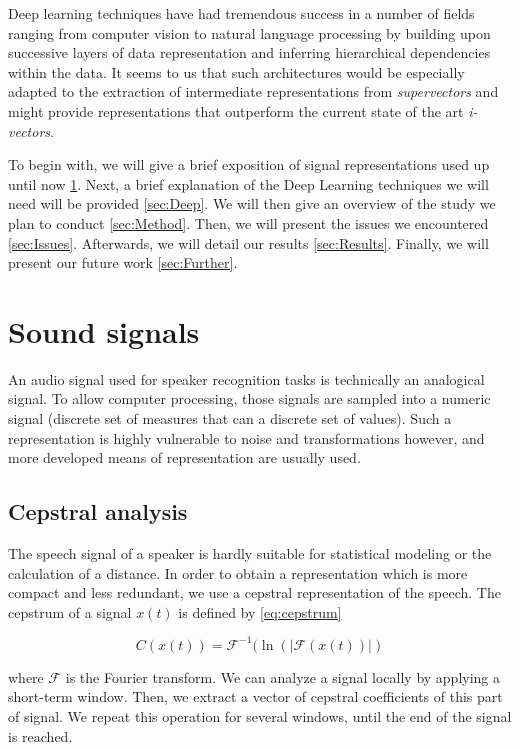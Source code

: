 \documentclass[conference]{IEEEtran}
\begin{document}
Deep learning techniques have had tremendous success in a number of fields
ranging from computer vision \cite{lecun1998gradient} to natural language
processing \cite{bordes2012joint} by building upon successive layers of data
representation and inferring hierarchical dependencies within the data. It seems
to us that such architectures would be especially adapted to the extraction of
intermediate representations from \emph{supervectors} and might provide
representations that outperform the current state of the art \emph{i-vectors}.

To begin with, we will give a brief exposition of signal representations used
up until now \ref{sec:signal}. Next, a brief explanation of the Deep
Learning techniques we will need will be provided \ref{sec:Deep}. We
will then give an overview of the study we plan to conduct \ref{sec:Method}.
Then, we will present the issues we encountered \ref{sec:Issues}.
Afterwards, we will detail our results \ref{sec:Results}.
Finally, we will present our future work \ref{sec:Further}.

\section{Sound signals}
\label{sec:signal}
An audio signal used for speaker recognition tasks is technically an analogical
signal. To allow computer processing, those signals are sampled into a numeric
signal (discrete set of measures that can a discrete set of values). Such a
representation is highly vulnerable to noise and transformations however,
and more developed means of representation are usually used.

\subsection{Cepstral analysis}

The speech signal of a speaker is hardly suitable for statistical modeling or
the calculation of a distance.
In order to obtain a representation which is more compact and less redundant, we
use a cepstral representation of the speech.
The cepstrum of a signal $x(t)$ is defined by \eqref{eq:cepstrum}

\begin{equation}
  C(x(t)) = \mathcal{F}^{-1}(\ln(|\mathcal{F}(x(t))|)
   \label{eq:cepstrum}
\end{equation}

where $\mathcal{F}$ is the Fourier transform.
We can analyze a signal locally by applying a short-term window. Then, we
extract a vector of cepstral coefficients of this part of signal. We repeat
this operation for several windows, until the end of the signal is reached.
\end{document}
